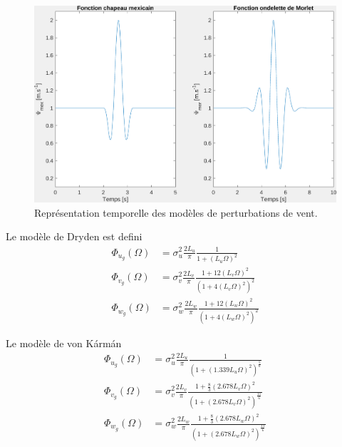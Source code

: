 \begin{figure}[ht!]
    \centerline{
    \includegraphics[trim=0cm 0cm 0cm 0cm,clip,width=0.9\columnwidth]{figures/mex_hat_morlet.png}}
    \caption{Représentation temporelle des modèles de perturbations de vent.}
    \label{fig:mexhat}
\end{figure}

Le modèle de Dryden est defini
\begin{subequations}
    \begin{align}
        \Phi _{u_{g}}(\Omega )& =\sigma _{u}^{2}{\frac {2L_{u}}{\pi }}{\frac {1}{1+(L_{u}\Omega )^{2}}}\\
        \Phi _{v_{g}}(\Omega )& =\sigma _{v}^{2}{\frac {2L_{v}}{\pi }}{\frac {1+12(L_{v}\Omega )^{2}}{\left(1+4(L_{v}\Omega )^{2}\right)^{2}}}\\
        \Phi _{w_{g}}(\Omega )& =\sigma _{w}^{2}{\frac {2L_{w}}{\pi }}{\frac {1+12(L_{w}\Omega )^{2}}{\left(1+4(L_{w}\Omega )^{2}\right)^{2}}}
    \end{align}
\end{subequations}

Le modèle de von Kármán
\begin{subequations}
    \begin{align}
        \Phi _{u_{g}}(\Omega )& =\sigma _{u}^{2}{\frac {2L_{u}}{\pi }}{\frac {1}{\left(1+(1.339L_{u}\Omega )^{2}\right)^{\frac {5}{6}}}}\\
        \Phi _{v_{g}}(\Omega )& =\sigma _{v}^{2}{\frac {2L_{v}}{\pi }}{\frac {1+{\frac {8}{3}}(2.678L_{v}\Omega )^{2}}{\left(1+(2.678L_{v}\Omega )^{2}\right)^{\frac {11}{6}}}}\\
        \Phi _{w_{g}}(\Omega )& =\sigma _{w}^{2}{\frac {2L_{w}}{\pi }}{\frac {1+{\frac {8}{3}}(2.678L_{w}\Omega )^{2}}{\left(1+(2.678L_{w}\Omega )^{2}\right)^{\frac {11}{6}}}}
    \end{align}
\end{subequations}


